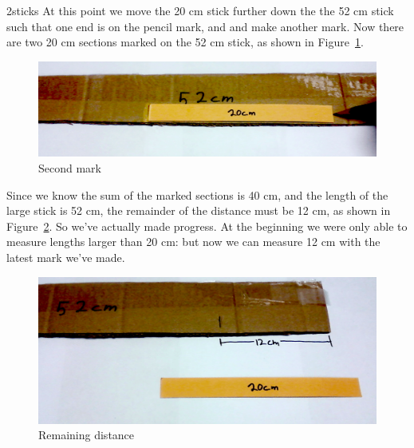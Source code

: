\begin{example}{2sticks}
\noindent At this point we move the 20 cm stick further down the the 52 cm stick such that one end is on the pencil mark, and and make another mark.  Now there are two 20 cm sections marked on the 52 cm stick, 
as shown in Figure~\ref{fig:3}.  
\begin{figure}
\begin{center}
	\includegraphics[width=1.00\textwidth]{images/2_sticks_step3.png}
\end{center}
\caption{Second mark\label{fig:3}}
\end{figure}

Since we know the sum of the marked sections is 40 cm, and the length of the large stick is 52 cm, the remainder of the distance must be 12 cm, as shown in Figure~\ref{fig:4}. So we've actually made progress. At the beginning we were only able to measure lengths larger than 20 cm: but now we can measure 12 cm with the latest mark we've made.
\begin{figure}
\begin{center}
	\includegraphics[width=1.00\textwidth]{images/2_sticks_step5.png}
\end{center}
\caption{Remaining distance\label{fig:4}}
\end{figure}


\end{example}
